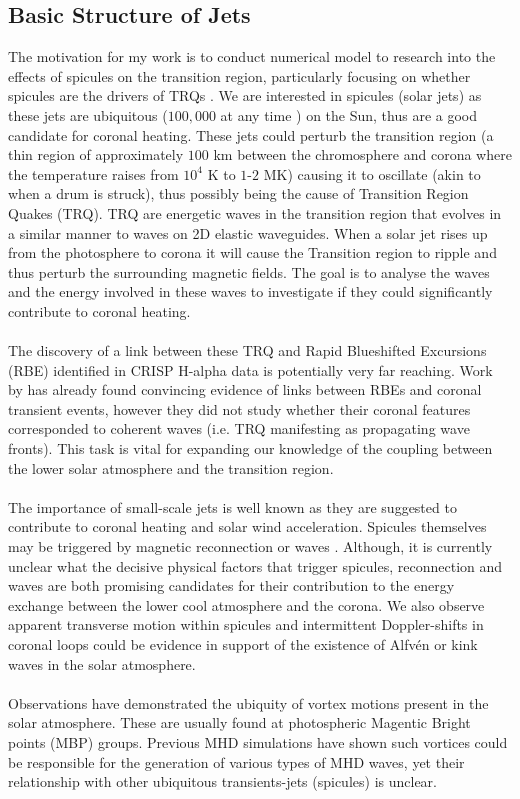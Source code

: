 \documentclass[12pt]{ociamthesis}
\newcommand{\Alfven}{Alfv\'{e}n }
\begin{document}
\subsection{Basic Structure of Jets}
\label{struc_of_jets}
The motivation for my work is to conduct numerical model to research into the effects of spicules on the transition region, particularly focusing on whether spicules are the drivers of TRQs \citep{Scullion2011}. We are interested in spicules (solar jets) as these jets are ubiquitous ($100,000$  at  any  time \citep{Beckers1968}) on the Sun, thus are a good candidate for coronal heating. These jets could perturb the transition region (a thin region of approximately $100$ km between the chromosphere and corona where the temperature raises from $10^4$ K to $1$-$2$ MK) causing it to oscillate (akin to when a drum is struck), thus possibly being the cause of Transition Region Quakes (TRQ). TRQ are energetic waves in the transition region that evolves in a similar manner to waves on 2D elastic waveguides. When a solar jet rises up from the photosphere to corona it will cause the Transition region to ripple and thus perturb the surrounding magnetic fields. The goal is to analyse the waves and the energy involved in these waves to investigate if they could significantly contribute to coronal heating. \\ \\ The discovery of a link between these TRQ and Rapid Blueshifted Excursions (RBE) identified in CRISP H-alpha data is potentially very far reaching. Work by \cite{Henriques2016} has already found convincing evidence of links between RBEs and coronal transient events, however they did not study whether their coronal features corresponded to coherent waves (i.e. TRQ manifesting as propagating wave fronts). This task is vital for expanding our knowledge of the coupling between the lower solar atmosphere and the transition region. \\ \\ The importance of small-scale jets is well known as they are suggested to contribute to coronal heating and solar wind acceleration. Spicules themselves may be triggered by magnetic reconnection \citep{Pontieu2007PASJ} or waves \citep{Pontieu2004Natur}. Although, it is currently unclear what the decisive physical factors that trigger spicules, reconnection and waves are both promising candidates for their contribution to the energy exchange between the lower cool atmosphere and the corona. We also observe apparent transverse motion within spicules and intermittent Doppler-shifts in coronal loops could be evidence in support of the existence of \Alfven or kink waves in the solar atmosphere.  \\ \\
Observations have demonstrated the ubiquity of vortex motions present in the solar atmosphere. These are usually found at photospheric Magentic Bright points (MBP) groups. Previous MHD simulations have shown such vortices could be responsible for the generation of various types of MHD waves, yet their relationship with other ubiquitous transients-jets (spicules) is unclear.
\end{document}
